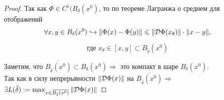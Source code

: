 \begin{proof}
    Так как $\Phi \in C^1(B_{\delta}(x^0)$, то по теореме Лагранжа о среднем для отображений 
    \[ \forall x, y \in B_{\delta}(x^0) \hookrightarrow \|\Phi(x) - \Phi(y)\| \leqslant \| \mathcal{D} \Phi (x_\theta) \| \cdot \| x - y \| \text{,}\]
    
    \[\text{где } x_{\theta} \in [x, y] \subset B_{\tilde{\delta}}(x^0) \]

    Заметим, что $\overline{B_{\tilde{\delta}}(x^0)} \subset B_{\delta}(x^0) \Rightarrow$ это компакт в шаре $B_{\delta}(x^0)$. \\
    Так как в силу непрерывности $\| \mathcal{D} \Phi(x) \|$ на $\overline{B_{\tilde{\delta}}(x^0)} \Rightarrow$ $\exists L(\tilde{\delta}) := \max_{x\in\overline{B_{\tilde{\delta}}(x^0)}}{\| \mathcal{D} \Phi (x) \|}$
\end{proof}

